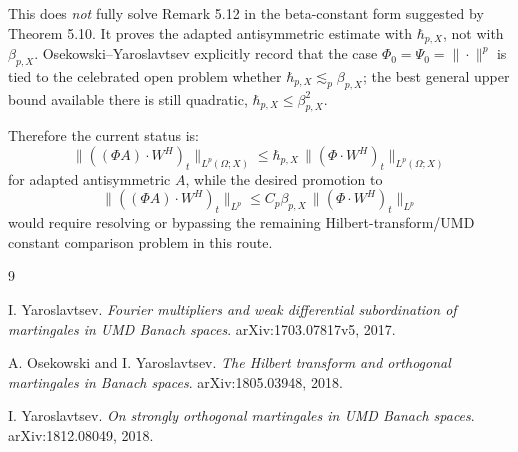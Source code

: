 \documentclass[11pt]{article}
\newcommand{\hbarp}{\hbar_{p,X}}
\newcommand{\betap}{\beta_{p,X}}
\begin{document}
This does \emph{not} fully solve Remark 5.12 in the beta-constant form
suggested by Theorem 5.10.  It proves the adapted antisymmetric estimate with
\(\hbarp\), not with \(\betap\).  Osekowski--Yaroslavtsev explicitly record
that the case \(\Phi_0=\Psi_0=\|\cdot\|^p\) is tied to the celebrated open
problem whether \(\hbarp\lesssim_p \betap\); the best general upper bound
available there is still quadratic, \(\hbarp\le \betap^2\).

Therefore the current status is:
\[
\|((\Phi A)\cdot W^H)_t\|_{L^p(\Omega;X)}
\le \hbarp\,\|(\Phi\cdot W^H)_t\|_{L^p(\Omega;X)}
\]
for adapted antisymmetric \(A\), while the desired promotion to
\[
\|((\Phi A)\cdot W^H)_t\|_{L^p}
\le C_p\betap\,\|(\Phi\cdot W^H)_t\|_{L^p}
\]
would require resolving or bypassing the remaining Hilbert-transform/UMD
constant comparison problem in this route.

\begin{thebibliography}{9}

I. Yaroslavtsev.
\newblock \emph{Fourier multipliers and weak differential subordination of
martingales in UMD Banach spaces}.
\newblock arXiv:1703.07817v5, 2017.

A. Osekowski and I. Yaroslavtsev.
\newblock \emph{The Hilbert transform and orthogonal martingales in Banach
spaces}.
\newblock arXiv:1805.03948, 2018.

I. Yaroslavtsev.
\newblock \emph{On strongly orthogonal martingales in UMD Banach spaces}.
\newblock arXiv:1812.08049, 2018.

\end{thebibliography}
\end{document}
